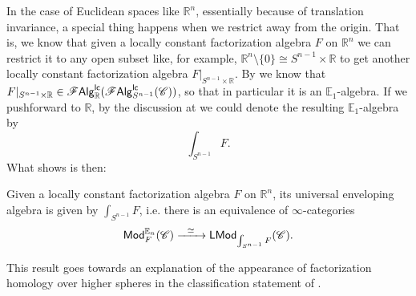 \documentclass[../text]{subfiles}
\begin{document}
\begin{remark}
    In the case of Euclidean spaces like $\mathbb{R}^n$, essentially because of translation invariance, a special thing happens when we restrict away from the origin. That is, we know that given a locally constant factorization algebra $F$ on $\mathbb{R}^n$ we can restrict it to any open subset like, for example, $\mathbb{R}^n \setminus \{ 0 \} \cong S^{n-1} \times \mathbb{R}$ to get another locally constant factorization algebra $F|_{S^{n-1} \times \mathbb{R}}$. By  we know that $F|_{S^{n-1} \times \mathbb{R}} \in \mathscr{F} \mathsf{Alg}^{\mathsf{lc}}_{\mathbb{R}} (\mathscr{F} \mathsf{Alg}^{\mathsf{lc}}_{S^{n-1}} (\mathscr{C}))$, so that in particular it is an $\mathbb{E}_1$-algebra. If we pushforward to $\mathbb{R}$, by the discussion at  we could denote the resulting $\mathbb{E}_1$-algebra by
    \begin{equation}
        \int_{S^{n-1}} F.
    \end{equation}
    What \cite[prop.3.16]{francis2013} shows is then:

    \begin{proposition}\label{univ_env_for_En}
        Given a locally constant factorization algebra $F$ on $\mathbb{R}^n$, its universal enveloping algebra is given by $\int_{S^{n-1}} F$, i.e. there is an equivalence of $\infty$-categories
        \begin{equation}
            \mathsf{Mod}^{\mathbb{E}_n}_{F} (\mathscr{C}) \xrightarrow{\ \ \simeq \ \ } \mathsf{LMod}_{\int_{S^{n-1}} F} (\mathscr{C}).
        \end{equation}
    \end{proposition}
    This result goes towards an explanation of the appearance of factorization homology over higher spheres in the classification statement of .
\end{remark}
\end{document}
